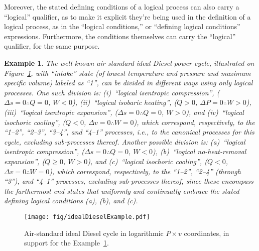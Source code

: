 \documentclass[fleqn,11pt]{SelfArx}
\newtheorem{example}{Example}
\begin{document}
    Moreover, the stated defining conditions of a logical process can also carry  a  ``logical''
    qualifier, as to make it explicit they're being used in the definition of a logical process,
    as  in  the  ``logical  conditions,''  or  ``defining  logical   conditions''   expressions.
    Furthermore, the conditions themselves can carry the ``logical''  qualifier,  for  the  same
    purpose.

    \begin{example}\label{ex:ideal.Diesel}
        The   well-known   air-standard   ideal   Diesel    power    cycle,    illustrated    on
        Figure~\ref{fig:cycle.Diesel}, with ``intake'' state (of lowest temperature and pressure
        and maximum specific volume) labeled as ``1'', can be divided in  different  ways  using
        only logical processes. One such division is:  (i)~``logical  isentropic  compression'',
        ($\Delta s\!=\!0 \therefore Q\!=\!0$, $W\!\!<\!0$), (ii)~``logical  isobaric  heating'',
        ($Q\!>\!0$,  $\Delta  P\!=\!0   \therefore   W\!\!>\!0$),   (iii)~``logical   isentropic
        expansion'', ($\Delta s\!=\!0  \therefore  Q\!=\!0$,  $W\!\!>\!0$),  and  (iv)~``logical
        isochoric  cooling'',  ($Q\!<\!0$,  $\Delta  v\!=\!0   \therefore   W\!\!=\!0$),   which
        correspond, respectively, to the ``1--2'', ``2--3'', ``3--4'', and  ``4--1''  processes,
        i.e., to the canonical  processes  for  this  cycle,  excluding  sub-processes  thereof.
        Another possible division is: (a)~``logical isentropic compression'',  ($\Delta  s\!=\!0
        \therefore   Q\!=\!0$,   $W\!\!<\!0$),   (b)~``logical   no-heat-removal    expansion'',
        ($Q\!\geqslant\!0$, $W\!\!>\!0$), and  (c)~``logical  isochoric  cooling'',  ($Q\!<\!0$,
        $\Delta v\!=\!0 \therefore W\!\!=\!0$), which correspond, respectively, to the ``1--2'',
        ``2--4'' (through ``3''), and ``4--1'' processes, excluding sub-processes thereof, since
        these encompass the farthermost end states that uniformly and  continually  embrace  the
        stated defining logical conditions (a), (b), and (c).
    \end{example}

    \begin{figure}[ht]
        \centering
        \texttt{[image: fig/idealDieselExample.pdf]}
        \caption{Air-standard ideal Diesel cycle in  logarithmic  $P\times  v$  coordinates,  in
            support for the Example~\ref{ex:ideal.Diesel}.}
        \label{fig:cycle.Diesel}
    \end{figure}
\end{document}
